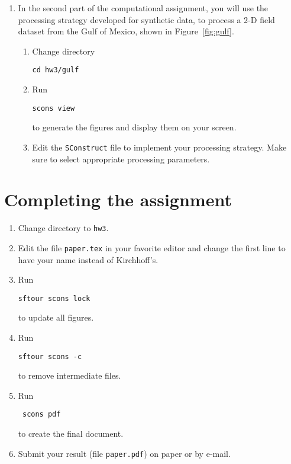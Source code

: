 \begin{enumerate}
\newpage


\item In the second part of the computational assignment, you will use the processing strategy developed for synthetic data, 
to process a 2-D field dataset from the Gulf of Mexico, shown in Figure~\ref{fig:gulf}.

\begin{enumerate}
\item Change directory 
\begin{verbatim}
cd hw3/gulf
\end{verbatim}
\item Run
\begin{verbatim}
scons view
\end{verbatim}
to generate the figures and display them on your screen.
\item Edit the \texttt{SConstruct} file to implement your processing strategy. 
Make sure to select appropriate processing parameters.
\end{enumerate}

\lstset{language=python,numbers=left,numberstyle=\tiny,showstringspaces=false}


\end{enumerate}

\section{Completing the assignment}

\begin{enumerate}
\item Change directory to \verb#hw3#.
\item Edit the file \texttt{paper.tex} in your favorite editor and change the
  first line to have your name instead of Kirchhoff's.
\item Run
\begin{verbatim}
sftour scons lock
\end{verbatim}
to update all figures.
\item Run
\begin{verbatim}
sftour scons -c
\end{verbatim}
to remove intermediate files.
\item Run
 \begin{verbatim} 
 scons pdf
\end{verbatim}
  to create the final document.
\item Submit your result (file \texttt{paper.pdf}) on paper or by
  e-mail. 
\end{enumerate}